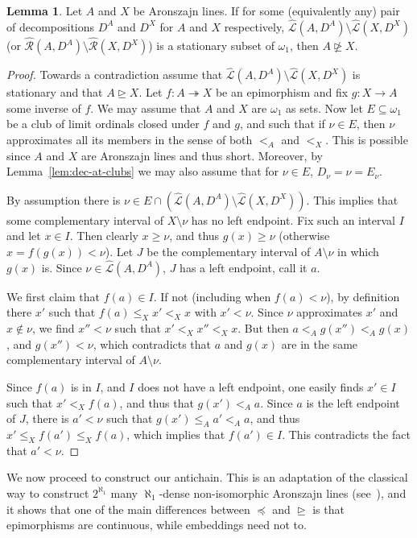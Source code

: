 \documentclass[10pt]{amsart}
\theoremstyle{definition}
\newtheorem{lemma}[theorem]{Lemma}
\theoremstyle{remark}
\newcommand{\seb}{\subseteq}
\newcommand{\setm}{\setminus}
\newcommand{\eleq}{\preceq}
\newcommand{\sgeq}{\trianglerighteq}
\newcommand{\nsgeq}{\ntrianglerighteq}
\newcommand{\sur}{\twoheadrightarrow}
\renewcommand{\L}{\mathscr{L}}
\newcommand{\R}{\mathscr{R}}
\newcommand{\La}{\hat{\L}}
\newcommand{\Ra}{\hat{\R}}
\newcommand{\1}{\mathbbm{1}}
\begin{document}
\begin{lemma}\label{lem:non_sur}
  Let $A$ and $X$ be Aronszajn lines. If for some (equivalently any)
  pair of decompositions $D^{A}$ and $D^{X}$ for $A$ and $X$ respectively,
  $\La(A,D^{A}) \setm \La(X,D^{X})$ (or $\Ra(A,D^{A}) \setm \Ra(X,D^{X})$)
  is a stationary subset of $\omega_{1}$,
  then $A \nsgeq X$.
\end{lemma}
\begin{proof}
  Towards a contradiction assume that $\La(A,D^{A}) \setm \La(X,D^{X})$
  is stationary and that $A \sgeq X$.
  Let $f : A \sur X$ be an epimorphism and fix $g : X \to A$
  some inverse of $f$.
  We may assume that $A$ and $X$ are $\omega_{1}$ as sets.
  Now let $E \seb \omega_{1}$ be a club of limit ordinals closed under $f$ and $g$,
  and such that if $\nu \in E$,
  then $\nu$ approximates all its members in the sense of both $<_{A}$ and $<_{X}$.
  This is possible since $A$ and $X$ are Aronszajn
  lines and thus short. Moreover, by Lemma~\ref{lem:dec-at-clubs} we may
  also assume that for $\nu \in E$,
  $D_{\nu} = \nu = E_{\nu}$.

  By assumption there is
  $\nu \in E \cap (\La(A,D^{A}) \setm \La(X,D^{X}))$. This implies that
  some complementary interval of $X \setm \nu$ has no left endpoint. Fix such
  an interval $I$ and let $x \in I$. Then clearly $x \ge \nu$, and
  thus $g(x) \ge \nu$ (otherwise $x = f(g(x)) < \nu$).
  Let $J$ be the complementary interval of $A \setm \nu$ in which $g(x)$ is.
  Since $\nu \in \La(A,D^{A})$, $J$ has a left endpoint, call it $a$.

  We first claim that $f(a) \in I$. If not (including when $f(a) < \nu$), by
  definition there $x'$ such that $f(a) \le_{X} x' <_{X} x$ with $x' < \nu$.
  Since $\nu$ approximates $x'$ and $x \notin \nu$,
  we find $x'' < \nu$ such that $x' <_{X} x'' <_{X} x$. But then
  $a <_{A} g(x'') <_{A} g(x)$, and $g(x'') < \nu$, which contradicts
  that $a$ and $g(x)$ are in the same complementary interval of
  $A \setm \nu$.

  Since $f(a)$ is in $I$, and $I$ does not have a left endpoint, one easily finds
  $x' \in I$ such that $x' <_{X} f(a)$, and thus that
  $g(x') <_{A} a$. Since $a$ is the left endpoint of $J$, there is $a' < \nu$
  such that $g(x') \le_{A} a' <_{A} a$, and thus
  $x' \le_{X} f(a') \le_{X} f(a)$, which implies that $f(a') \in I$. This contradicts
  the fact that $a' < \nu$.
\end{proof}

We now proceed to construct our antichain. This is an adaptation
of the classical way to construct $2^{\aleph_{1}}$ many $\aleph_{1}$-dense
non-isomorphic Aronszajn lines (see~\cite[Theorem~4.8]{Baumgartner1982}),
and it shows that one of the main differences between $\eleq$ and
$\sgeq$ is that epimorphisms are continuous, while embeddings need not to.
\end{document}
